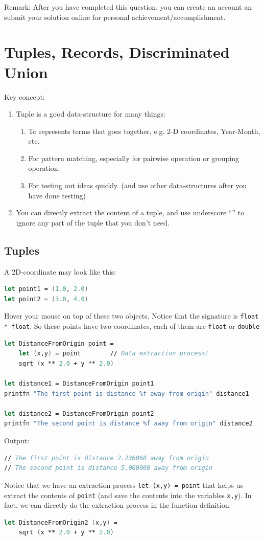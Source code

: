 \documentclass[12pt]{article}
\begin{document}
Remark: After you have completed this question, you can create an account an submit your solution online for personal achievement/accomplishment.
\pagebreak

\section{Tuples, Records, Discriminated Union}
Key concept:
\begin{enumerate}
\item Tuple is a good data-structure for many things:
\begin{enumerate}
\item To represents terms that goes together, e.g. 2-D coordinates, Year-Month, etc.
\item For pattern matching, especially for pairwise operation or grouping operation.
\item For testing out ideas quickly. (and use other data-structures after you have done testing)
\end{enumerate} 
\item You can directly extract the content of a tuple, and use underscore ``\underline{\:\:}'' to ignore any part of the tuple that you don't need.
\end{enumerate}

\subsection{Tuples}
A 2D-coordinate may look like this:
\begin{lstlisting}[language=FSharp]
let point1 = (1.0, 2.0)
let point2 = (3.0, 4.0)
\end{lstlisting}
Hover your mouse on top of these two objects. Notice that the signature is \texttt{float * float}. So these points have two coordinates, each of them are \texttt{float} or \texttt{double}

\begin{lstlisting}[language=FSharp]
let DistanceFromOrigin point =
    let (x,y) = point        // Data extraction process!
    sqrt (x ** 2.0 + y ** 2.0)

let distance1 = DistanceFromOrigin point1
printfn "The first point is distance %f away from origin" distance1

let distance2 = DistanceFromOrigin point2
printfn "The second point is distance %f away from origin" distance2
\end{lstlisting}
Output:
\begin{lstlisting}[language=FSharp]
// The first point is distance 2.236068 away from origin
// The second point is distance 5.000000 away from origin
\end{lstlisting}
Notice that we have an extraction process \texttt{let (x,y) = point} that helps us extract the contents of \texttt{point} (and save the contents into the variables \texttt{x,y}). In fact, we can directly do the extraction process in the function definition:
\begin{lstlisting}[language=FSharp]
let DistanceFromOrigin2 (x,y) =
    sqrt (x ** 2.0 + y ** 2.0)
\end{lstlisting}
\pagebreak
\end{document}
